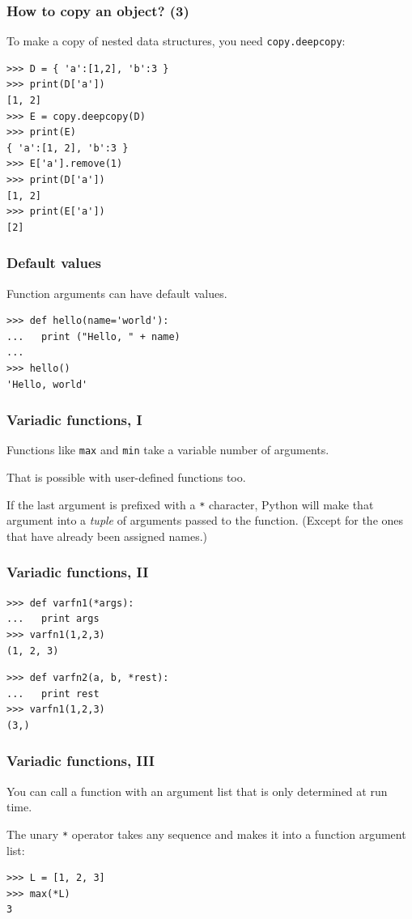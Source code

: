 \documentclass[english,serif,mathserif,xcolor=pdftex,dvipsnames,table]{beamer}
\begin{document}
\begin{frame}[fragile]
  \frametitle{How to copy an object? (3)}  
To make a copy of nested data structures, you need \texttt{copy.deepcopy}:
  \begin{lstlisting}
>>> D = { 'a':[1,2], 'b':3 }
>>> print(D['a'])
[1, 2]
>>> E = copy.deepcopy(D)
>>> print(E)
{ 'a':[1, 2], 'b':3 }
>>> E['a'].remove(1)
>>> print(D['a'])
[1, 2]    
>>> print(E['a'])
[2]    
  \end{lstlisting}
\end{frame}


\begin{frame}[fragile]
  \frametitle{Default values}

  Function arguments can have default values.
\begin{lstlisting}
>>> def hello(name='world'):
...   print ("Hello, " + name)
...
>>> hello()
'Hello, world'
\end{lstlisting}
\end{frame}


\begin{frame}[fragile]
  \frametitle{Variadic functions, I}
  Functions like \texttt{max} and \texttt{min} take a variable number of arguments.

  \+
  That is possible with user-defined functions too.

  \+
  If the last argument is prefixed with a \texttt{*} character,
  Python will make that argument into a \emph{tuple} of arguments
  passed to the function. (Except for the ones that have already been
  assigned names.)
\end{frame}


\begin{frame}
  \frametitle{Variadic functions, II}
\begin{lstlisting}
>>> def varfn1(*args):
...   print args
>>> varfn1(1,2,3)
(1, 2, 3)
\end{lstlisting}

\begin{lstlisting}
>>> def varfn2(a, b, *rest):
...   print rest
>>> varfn1(1,2,3)
(3,)
\end{lstlisting}
\end{frame}


\begin{frame}[fragile]
  \frametitle{Variadic functions, III}
  You can call a function with an argument list that is only
  determined at run time.

  \+
  The unary \texttt{*} operator takes any sequence and makes it
  into a function argument list:
\begin{lstlisting}
>>> L = [1, 2, 3]
>>> max(*L)
3
\end{lstlisting}
\end{frame}
\end{document}
